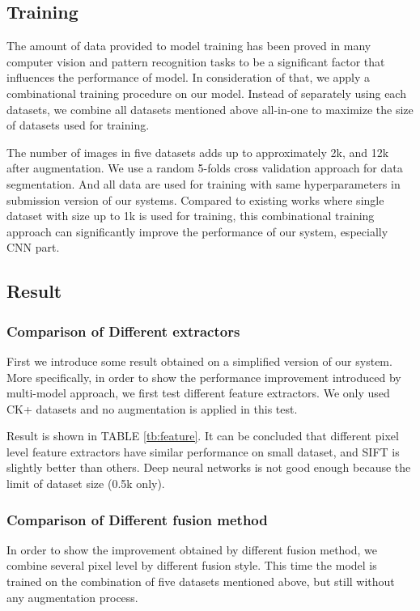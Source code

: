 \documentclass[conference]{IEEEtran}
\begin{document}
\subsection{Training}
The amount of data provided to model training has been proved in many computer vision and pattern recognition tasks to be a significant factor that influences the performance of model. In consideration of that, we apply a combinational training procedure on our model. Instead of separately using each datasets, we combine all datasets mentioned above all-in-one to maximize the size of datasets used for training.

The number of images in five datasets adds up to approximately 2k, and 12k after augmentation. We use a random 5-folds cross validation approach for data segmentation. And all data are used for training with same hyperparameters in submission version of our systems. Compared to existing works where single dataset with size up to 1k is used for training, this combinational training approach can significantly improve the performance of our system, especially CNN part.

\subsection{Result}
\subsubsection{Comparison of Different extractors}
First we introduce some result obtained on a simplified version of our system. More specifically, in order to show the performance improvement introduced by multi-model approach, we first test different feature extractors. We only used CK+ datasets and no augmentation is applied in this test.

Result is shown in TABLE \ref{tb:feature}. It can be concluded that different pixel level feature extractors have similar performance on small dataset, and SIFT is slightly better than others. Deep neural networks is not good enough because the limit of dataset size (0.5k only).

\subsubsection{Comparison of Different fusion method}
In order to show the improvement obtained by different fusion method, we combine several pixel level by different fusion style. This time the model is trained on the combination of five datasets mentioned above, but still without any augmentation process.
\end{document}
